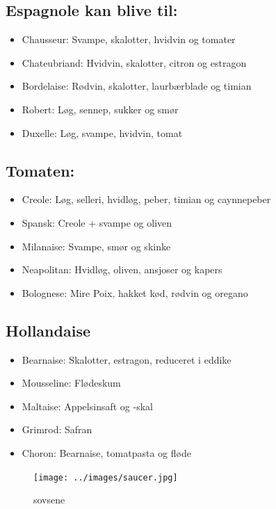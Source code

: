 \documentclass[
]{book}
\providecommand{\tightlist}{%
  \setlength{\itemsep}{0pt}\setlength{\parskip}{0pt}}
\begin{document}
\subsection{Espagnole kan blive til:}\label{espagnole-kan-blive-til}

\begin{itemize}
\tightlist
\item
  Chausseur: Svampe, skalotter, hvidvin og tomater
\item
  Chateubriand: Hvidvin, skalotter, citron og estragon
\item
  Bordelaise: Rødvin, skalotter, laurbærblade og timian
\item
  Robert: Løg, sennep, sukker og smør
\item
  Duxelle: Løg, svampe, hvidvin, tomat
\end{itemize}

\subsection{Tomaten:}\label{tomaten}

\begin{itemize}
\tightlist
\item
  Creole: Løg, selleri, hvidløg, peber, timian og caynnepeber
\item
  Spansk: Creole + svampe og oliven
\item
  Milanaise: Svampe, smør og skinke
\item
  Neapolitan: Hvidløg, oliven, ansjoser og kapers
\item
  Bolognese: Mire Poix, hakket kød, rødvin og oregano
\end{itemize}

\subsection{Hollandaise}\label{hollandaise}

\begin{itemize}
\tightlist
\item
  Bearnaise: Skalotter, estragon, reduceret i eddike
\item
  Mousseline: Flødeskum
\item
  Maltaise: Appelsinsaft og -skal
\item
  Grimrod: Safran
\item
  Choron: Bearnaise, tomatpasta og fløde
\end{itemize}

\begin{figure}
\centering
\texttt{[image: ../images/saucer.jpg]}
\caption{sovsene}
\end{figure}
\end{document}
